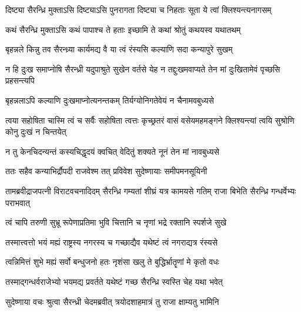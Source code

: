


\twolineshloka
{दिष्ट्या सैरन्ध्रि मुक्ताऽसि दिष्ट्याऽसि पुनरागता}
{दिष्ट्या च निहताः सूता ये त्वां क्लिश्यन्त्यनागसम्}




\twolineshloka
{कथं सैरन्ध्रि मुक्ताऽसि कथं पापाश्च ते हताः}
{इच्छामि ते कथां श्रोतुं कथयस्व यथातथम्}




\twolineshloka
{बृहन्नले किन्नु तव सैरन्ध्र्या कार्यमद्य वै}
{या त्वं रंस्यसि कल्याणि सदा कन्यापुरे सुखम्}


\threelineshloka
{न हि दुःख समाप्नोषि सैरन्ध्री यदुपाश्रुते}
{सुखेन वर्तसे येह न तद्दुःखमवाप्यते}
{तेन मां दुःखितामेवं पृच्छसि प्रहसन्त्यपि}




\twolineshloka
{बृहन्नलाऽपि कल्याणि दुःखमाप्नोत्यनन्तकम्}
{तिर्यग्योनिगतेवेयं न चैनामवबुध्यसे}


\threelineshloka
{त्वया सहोषिता चास्मि त्वं च सर्वैः सहोषिता}
{त्वत्तः कृच्छ्रतरं वासं वसेयमहमङ्गने}
{क्लिश्यन्त्यां त्वयि सुश्रोणि कोनु दुःखं न चिन्तयेत्}


\twolineshloka
{न तु केनचिदन्यन्तं कस्यचिद्धृदयं क्वचित्}
{वेदितुं शक्यते नूनं तेन मां नावबुध्यसे}



\twolineshloka
{ततः सहैव कन्याभिर्द्रौपदी राजवेश्म तत्}
{प्रविवेश सुदेष्णायाः समीपमनसूयिनी}


\threelineshloka
{तामब्रवीद्राजपत्नी विराटवचनादिदम्}
{सैरन्ध्रि गम्यतां शीघ्रं यत्र कामयसे गतिम्}
{राजा बिभेति सैरन्ध्रि गन्धर्वेभ्यः पराभवात्}


\twolineshloka
{त्वं चापि तरुणी सुभ्रू रूपेणाप्रतिमा भुवि}
{चित्तानि च नृणां भद्रे रक्तानि स्पर्शजे सुखे}


\twolineshloka
{तस्मात्त्वत्तो भयं मह्यं राष्ट्रस्य नगरस्य च}
{गच्छाद्यैव यथेष्टं त्वं नगराद्यत्र रंस्यसे}


\twolineshloka
{त्वन्निमित्तं शुभे मह्यं सर्वो बन्धुजनो हतः}
{नृशंसा खलु ते बुद्धिर्भ्रातॄणां मे कृतो वधः}


\twolineshloka
{तस्माद्गन्धर्वराजेभ्यो भयमद्य प्रवर्तते}
{यथेष्टं गच्छ सैरन्ध्रि स्वस्ति चेह यथा भवेत्}



\twolineshloka
{सुदेष्णाया वचः श्रुत्वा सैरन्ध्री चेदमब्रवीत्}
{त्रयोदशाहमात्रं तु राजा क्षाम्यतु भामिनि}


